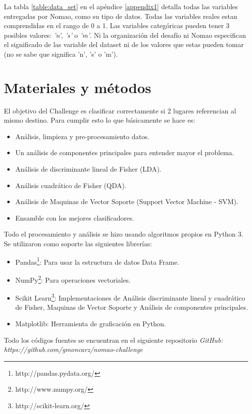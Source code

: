 \documentclass[journal]{IEEEtran}
\begin{document}
La tabla \ref{table:data_set} en el apéndice \ref{appendix1} detalla todas las variables entregadas por 
Nomao, como su tipo de datos. Todas las variables reales estan comprendidas
en el rango de 0 a 1. Las variables
categóricas pueden tener 3 posibles valores: \textit{'n'}, \textit{'s'} 
o \textit{'m'}. Ni la organización del desafío ni Nomao especifican 
el significado de las variable del dataset ni de los valores
que estas pueden tomar (no se sabe que significa 'n', 's' o 'm').


\section{Materiales y métodos}

El objetivo del Challenge es clasificar correctamente si 2 lugares
referencian al mismo destino. Para cumplir esto lo que básicamente se hace es:
\begin{itemize}
\item Análisis, limpieza y pre-procesamiento datos. 
\item Un análisis de componentes principales para entender mayor el problema. 
\item Análisis de discriminante lineal de Fisher (LDA).
\item Análisis cuadrático de Fisher (QDA).
\item Análisis de Maquinas de Vector Soporte (Support Vector Machine - SVM).
\item Ensamble con los mejores clasificadores.
\end{itemize}

Todo el procesamiento y análisis se hizo usando algoritmos propios en Python 3. Se
utilizaron como soporte las siguientes librerías:
\begin{itemize}
\item Pandas\footnote{http://pandas.pydata.org/}: Para usar la estructura de datos Data Frame.
\item NumPy\footnote{http://www.numpy.org/}: Para operaciones vectoriales.
\item Scikit Learn\footnote{http://scikit-learn.org/}: Implementaciones de Análisis discriminante lineal
	y cuadrático de Fisher, Maquinas de Vector Soporte y Análisis
	de componentes principales.
\item Matplotlib: Herramienta de graficación en Python.
\end{itemize}

Todo los códigos fuentes se encuentran en el siguiente repositorio
\textit{GitHub: https://github.com/gmoncarz/nomao-challenge}
\end{document}
